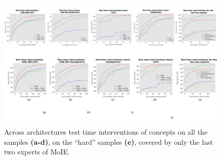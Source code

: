 \begin{figure}[ht]
\vskip 0.2in
\begin{center}
\centerline{\includegraphics[width=\linewidth]{figures/main/TTI_all.pdf}}
\caption{Across architectures test time interventions of concepts  on all the samples \textbf{(a-d)}, on the ``hard'' samples \textbf{(e)}, covered by only the last two experts of MoIE. 
}
\label{fig:tti}
\end{center}
\vskip -0.2in
\end{figure}


